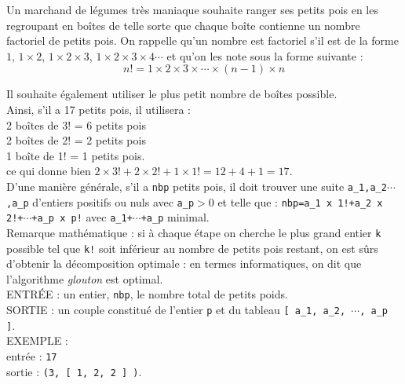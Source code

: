 Un marchand de légumes très maniaque souhaite ranger ses petits pois en les regroupant en boîtes de 
telle sorte que chaque boîte contienne un nombre factoriel de petits pois. On rappelle qu'un nombre 
est factoriel s'il est de la forme $1$, $1 \times 2$, $1 \times 2 \times 3$, $1 \times 2 \times 3 
\times 4\cdots$ et qu'on les note sous la forme suivante :\\
$$n!=1\times 2\times 3\times \cdots\times (n-1)\times n$$

Il souhaite également utiliser le plus petit nombre de boîtes possible.\\
Ainsi, s'il a 17 petits pois, il utilisera :\\
   \hspace*{2cm} 2 boîtes de 3! = 6 petits pois\\
   \hspace*{2cm} 2 boîtes de 2! = 2 petits pois\\
   \hspace*{2cm} 1 boîte de 1! = 1 petits pois.\\
ce qui donne bien $2 \times 3! + 2 \times 2! + 1 \times 1! = 12 + 4 + 1 = 17$.\\

D'une manière générale, s'il a \texttt{nbp} petits pois, il doit trouver une suite 
\texttt{a\_1,a\_2$\cdots$,a\_p} d'entiers positifs ou nuls avec \texttt{a\_p}$>0$ et telle que :
\texttt{nbp=a\_1 x  1!+a\_2 x  2!+$\cdots$+a\_p x  p!} avec 
\texttt{a\_1+$\cdots$+a\_p} minimal. \\
Remarque mathématique : si à chaque étape on cherche le plus grand entier \texttt{k} possible tel 
que \texttt{k!} soit inférieur au nombre de petits pois restant, on est sûrs d'obtenir la 
décomposition optimale : en termes informatiques, on dit que l'algorithme \textit{glouton} est 
optimal.\\

\noindent ENTRÉE : un entier, \texttt{nbp}, le nombre total de petits poids.\\
\noindent SORTIE : un couple constitué de l'entier \texttt{p} et du tableau 
\texttt{[ a\_1, a\_2, $\cdots$, a\_p ]}.\\

\noindent EXEMPLE :\\
entrée : \texttt{17}\\
sortie : \texttt{(3, [ 1, 2, 2 ] )}.